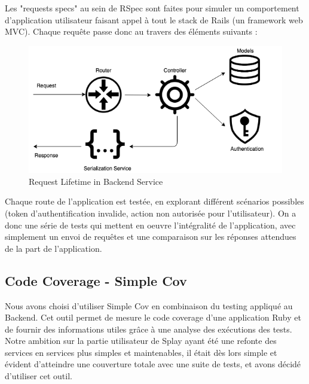 \documentclass{eplmastersthesis}
\begin{document}
          Les "requests specs" au sein de RSpec sont faites pour simuler un
          comportement d'application utilisateur faisant appel à tout le stack
          de Rails (un framework web MVC).
          Chaque requête passe donc au travers des éléments suivants :\\

          \begin{figure}[H]
            \centering
            \includegraphics[scale=0.6]{figures/request_test.png}
            \caption{\label{new_arch} Request Lifetime in Backend Service}
          \end{figure}

          Chaque route de l'application est testée, en explorant différent
          scénarios possibles (token d'authentification invalide, action
          non autorisée pour l'utilisateur). On a donc une série de tests
          qui mettent en oeuvre l'intégralité de l'application, avec simplement
          un envoi de requêtes et une comparaison sur les réponses attendues
          de la part de l'application.

      \subsection{Code Coverage - Simple Cov}

        Nous avons choisi d'utiliser Simple Cov en combinaison du testing appliqué
        au Backend. Cet outil permet de mesure le code coverage d'une application
        Ruby et de fournir des informations utiles grâce à une analyse des
        exécutions des tests.\\

        Notre ambition sur la partie utilisateur de Splay ayant été une refonte
        des services en services plus simples et maintenables, il était dès lors
        simple et évident d'atteindre une couverture totale avec une suite de tests,
        et avons décidé d'utiliser cet outil.
\end{document}
